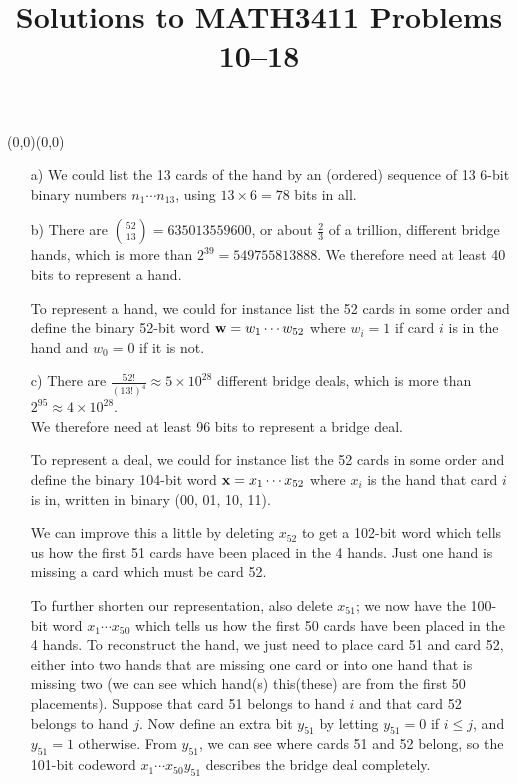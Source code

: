 \documentclass[11pt]{article}
\date{}
\author{}
\title{\sc Solutions to MATH3411 Problems 10--18}
\newcommand{\moveup}{\begin{picture}(0,0)(0,0)\end{picture}\vspace*{-8.15mm}}
\begin{document}
 \maketitle

\vspace*{-10mm}

\moveup
\begin{itemize}
  \item[{a)}]
    We could list the 13 cards of the hand by an (ordered) sequence of 13 6-bit binary numbers $n_1\cdots n_{13}$,
    using $13\times6 = 78$ bits in all.
  \item[{b)}]
     There are $\binom{52}{13} = 635013559600$, or about $\frac{2}{3}$ of a trillion, different bridge hands,
     which is more than $2^{39} = 549755813888$.
     We therefore need at least 40 bits to represent a hand.

     To represent a hand, we could for instance list the 52 cards in some order
     and define the binary 52-bit word ${\bf w} = w_1\cdots w_{52}$
     where $w_i = 1$ if card $i$ is in the hand and $w_0 = 0$ if it is not.
  \item[{c)}]
     There are $\frac{52!}{(13!)^4} \approx 5\times10^{28}$ different bridge deals,
     which is more than $2^{95} \approx 4\times10^{28}$.\\
     We therefore need at least 96 bits to represent a bridge deal.

     To represent a deal, we could for instance list the 52 cards in some order
     and define the binary 104-bit word ${\bf x} = x_1\cdots x_{52}$
     where $x_i$ is the hand that card $i$ is in, written in binary (00, 01, 10, 11).

     We can improve this a little by deleting $x_{52}$ to get a 102-bit word
     which tells us how the first 51 cards have been placed in the 4 hands.
     Just one hand is missing a card which must be card 52.

     To further shorten our representation, also delete $x_{51}$;
     we now have the 100-bit word $x_1\cdots x_{50}$
     which tells us how the first 50 cards have been placed in the 4 hands.
     To reconstruct the hand, we just need to place card 51 and card 52,
     either into two hands that are missing one card
     or into one hand that is missing two
     (we can see which hand(s) this(these) are from the first 50 placements).
     Suppose that card 51 belongs to hand $i$
     and that card 52 belongs to hand $j$.
     Now define an extra bit $y_{51}$ by letting $y_{51}=0$ if $i\leq j$,
     and $y_{51}=1$ otherwise.
     From $y_{51}$, we can see where cards 51 and 52 belong,
     so the 101-bit codeword $x_1\cdots x_{50}y_{51}$ describes the bridge deal completely.     
\end{itemize}
\end{document}
